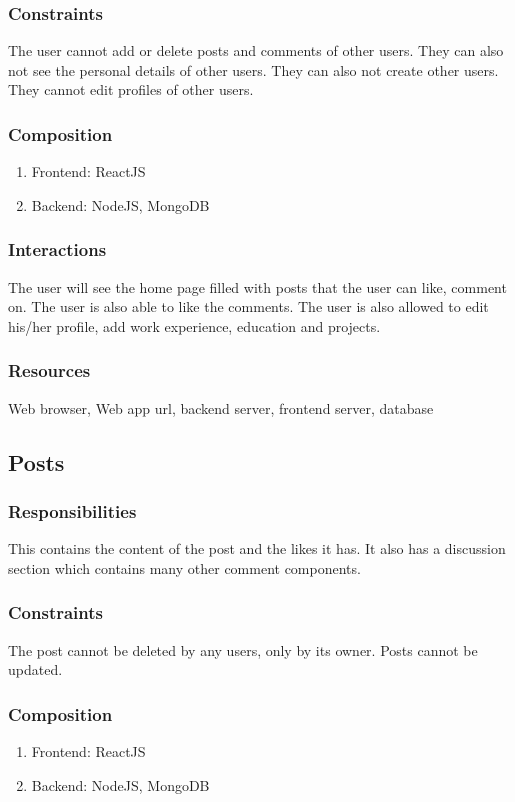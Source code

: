 \documentclass[12pt]{article}
\begin{document}
\subsubsection{Constraints}
The user cannot add or delete posts and comments of other users. They can also not see the personal details of other users. They can also not create other users. They cannot edit profiles of other users.
\subsubsection{Composition}
\begin{enumerate}
    \item Frontend: ReactJS
    \item Backend: NodeJS, MongoDB
\end{enumerate}
\subsubsection{Interactions}
The user will see the home page filled with posts that the user can like, comment on. The user is also able to like the comments. The user is also allowed to edit his/her profile, add work experience, education and projects.
\subsubsection{Resources}
Web browser, Web app url, backend server, frontend server, database

\subsection{Posts}
\subsubsection{Responsibilities}
This contains the content of the post and the likes it has. It also has a discussion section which contains many other comment components.
\subsubsection{Constraints}
The post cannot be deleted by any users, only by its owner. Posts cannot be updated. 
\subsubsection{Composition}
\begin{enumerate}
    \item Frontend: ReactJS
    \item Backend: NodeJS, MongoDB
\end{enumerate}
\end{document}
